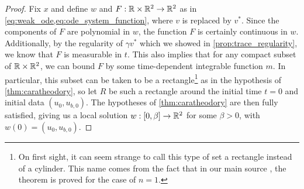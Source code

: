 \begingroup
\newcommand{\vb}{\overline{v}}
\newcommand{\vt}{\widetilde{v}}
\newcommand{\ub}{\overline{u}}
\newcommand{\ut}{\widetilde{u}}
\newcommand{\ubb}{\overline{u}_b}
\newcommand{\ubt}{\widetilde{u}_b}
\begin{proof}
    Fix $x$ and define $w$ and $F: \mathbb{R} \times \mathbb{R}^2 \to \mathbb{R}^2$ as in \cref{eq:weak_ode,eq:ode_system_function}, where $v$ is replaced by $v^*$. Since the components of $F$ are polynomial in $w$, the function $F$ is certainly continuous in $w$. Additionally, by the regularity of $\gamma v^*$ which we showed in \cref{prop:trace_regularity}, we know that $F$ is measurable in $t$. This also implies that for any compact subset of $\mathbb{R} \times \mathbb{R}^2$, we can bound $F$ by some time-dependent integrable function $m$. In particular, this subset can be taken to be a rectangle\footnote{On first sight, it can seem strange to call this type of set a rectangle instead of a cylinder. This name comes from the fact that in our main source \cite{coddington_theory_1984}, the theorem is proved for the case of $n = 1$. } as in the hypothesis of \cref{thm:caratheodory}, so let $R$ be such a rectangle around the initial time $t = 0$ and initial data $(u_0, u_{b,0})$. The hypotheses of \cref{thm:caratheodory} are then fully satisfied, giving us a local solution $w: [0, \beta] \to \mathbb{R}^2$ for some $\beta > 0$, with $w(0) = (u_0, u_{b,0})$.


\end{proof}
